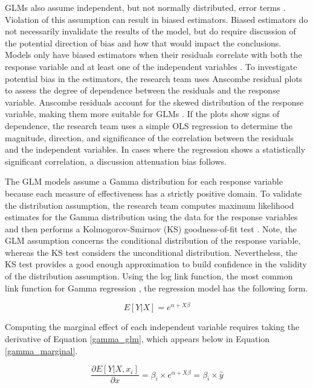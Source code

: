 GLMs also assume independent, but not normally distributed, error terms \cite{fahrmeir}. Violation of this assumption can result in biased estimators. Biased estimators do not necessarily invalidate the results of the model, but do require discussion of the potential direction of bias and how that would impact the conclusions. Models only have biased estimators when their residuals correlate with both the response variable and at least one of the independent variables \cite{wooldridge}. To investigate potential bias in the estimators, the research team uses Anscombe residual plots to assess the degree of dependence between the residuals and the response variable. Anscombe residuals account for the skewed distribution of the response variable, making them more suitable for GLMs \cite{anscombe}. If the plots show signs of dependence, the research team uses a simple OLS regression to determine the magnitude, direction, and significance of the correlation between the residuals and the independent variables. In cases where the regression shows a statistically significant correlation, a discussion attenuation bias follows.

The GLM models assume a Gamma distribution for each response variable because each measure of effectiveness has a strictly positive domain. To validate the distribution assumption, the research team computes maximum likelihood estimates for the Gamma distribution using the data for the response variables and then performs a Kolmogorov-Smirnov (KS) goodness-of-fit test \cite{wackerly, massey}. Note, the GLM assumption concerns the conditional distribution of the response variable, whereas the KS test considers the unconditional distribution. Nevertheless, the KS test provides a good enough approximation to build confidence in the validity of the distribution assumption. Using the log link function, the most common link function for Gamma regression \cite{fahrmeir}, the regression model has the following form.

\begin{equation}
\label{gamma_glm}
    E[Y|X] = e^{\alpha + X \beta}
\end{equation}

Computing the marginal effect of each independent variable requires taking the derivative of Equation \ref{gamma_glm}, which appears below in Equation \ref{gamma_marginal}.

\begin{equation}
\label{gamma_marginal}
\frac{\partial E[Y|X, x_i]}{\partial x} = \beta_i \times e^{\alpha + X \beta}  = \beta_i \times \hat{y}
\end{equation}


